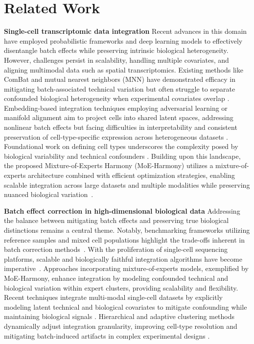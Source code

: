\documentclass{article}
\begin{document}
\section*{Related Work}

\textbf{Single-cell transcriptomic data integration} Recent advances in this domain have employed probabilistic frameworks and deep learning models to effectively disentangle batch effects while preserving intrinsic biological heterogeneity. However, challenges persist in scalability, handling multiple covariates, and aligning multimodal data such as spatial transcriptomics. Existing methods like ComBat and mutual nearest neighbors (MNN) have demonstrated efficacy in mitigating batch-associated technical variation but often struggle to separate confounded biological heterogeneity when experimental covariates overlap \citep{Bttner2018ATM,Haghverdi2018BatchEI}. Embedding-based integration techniques employing adversarial learning or manifold alignment aim to project cells into shared latent spaces, addressing nonlinear batch effects but facing difficulties in interpretability and consistent preservation of cell-type-specific expression across heterogeneous datasets \citep{Liu2020JointlyDC,Regev2017TheHC}. Foundational work on defining cell types underscores the complexity posed by biological variability and technical confounders \citep{Regev2017TheHC}. Building upon this landscape, the proposed Mixture-of-Experts Harmony (MoE-Harmony) utilizes a mixture-of-experts architecture combined with efficient optimization strategies, enabling scalable integration across large datasets and multiple modalities while preserving nuanced biological variation~\citep{Maan2022TheDI,Dou2020UnbiasedIO}.

\textbf{Batch effect correction in high-dimensional biological data} Addressing the balance between mitigating batch effects and preserving true biological distinctions remains a central theme. Notably, benchmarking frameworks utilizing reference samples and mixed cell populations highlight the trade-offs inherent in batch correction methods~\citep{Chen2020AMS}. With the proliferation of single-cell sequencing platforms, scalable and biologically faithful integration algorithms have become imperative~\citep{Gondal2024ASO}. Approaches incorporating mixture-of-experts models, exemplified by MoE-Harmony, enhance integration by modeling confounded technical and biological variation within expert clusters, providing scalability and flexibility. Recent techniques integrate multi-modal single-cell datasets by explicitly modeling latent technical and biological covariates to mitigate confounding while maintaining biological signals \citep{Butler2018IntegratingST,Wu2024SinglecellST}. Hierarchical and adaptive clustering methods dynamically adjust integration granularity, improving cell-type resolution and mitigating batch-induced artifacts in complex experimental designs \citep{Hicks2018MissingDA,Venkatasubramanian2019ResolvingSH}.
\end{document}
